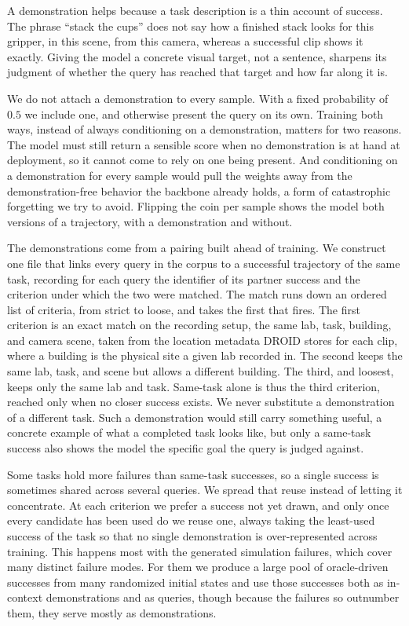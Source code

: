 A demonstration helps because a task description is a thin account of success. The phrase ``stack the cups'' does not say how a finished stack looks for this gripper, in this scene, from this camera, whereas a successful clip shows it exactly. Giving the model a concrete visual target, not a sentence, sharpens its judgment of whether the query has reached that target and how far along it is.

We do not attach a demonstration to every sample. With a fixed probability of $0.5$ we include one, and otherwise present the query on its own. Training both ways, instead of always conditioning on a demonstration, matters for two reasons. The model must still return a sensible score when no demonstration is at hand at deployment, so it cannot come to rely on one being present. And conditioning on a demonstration for every sample would pull the weights away from the demonstration-free behavior the backbone already holds, a form of catastrophic forgetting we try to avoid. Flipping the coin per sample shows the model both versions of a trajectory, with a demonstration and without.

The demonstrations come from a pairing built ahead of training. We construct one file that links every query in the corpus to a successful trajectory of the same task, recording for each query the identifier of its partner success and the criterion under which the two were matched. The match runs down an ordered list of criteria, from strict to loose, and takes the first that fires. The first criterion is an exact match on the recording setup, the same lab, task, building, and camera scene, taken from the location metadata DROID stores for each clip, where a building is the physical site a given lab recorded in. The second keeps the same lab, task, and scene but allows a different building. The third, and loosest, keeps only the same lab and task. Same-task alone is thus the third criterion, reached only when no closer success exists. We never substitute a demonstration of a different task. Such a demonstration would still carry something useful, a concrete example of what a completed task looks like, but only a same-task success also shows the model the specific goal the query is judged against.

Some tasks hold more failures than same-task successes, so a single success is sometimes shared across several queries. We spread that reuse instead of letting it concentrate. At each criterion we prefer a success not yet drawn, and only once every candidate has been used do we reuse one, always taking the least-used success of the task so that no single demonstration is over-represented across training. This happens most with the generated simulation failures, which cover many distinct failure modes. For them we produce a large pool of oracle-driven successes from many randomized initial states and use those successes both as in-context demonstrations and as queries, though because the failures so outnumber them, they serve mostly as demonstrations.

